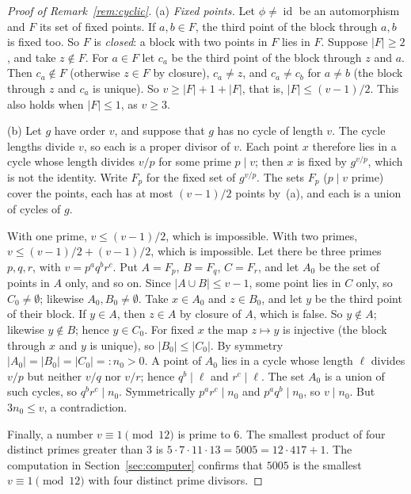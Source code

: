 \documentclass[11pt]{amsart}
\theoremstyle{plain}
\theoremstyle{definition}
\theoremstyle{remark}
\numberwithin{equation}{section}
\newcommand{\abs}[1]{\lvert #1\rvert}
\DeclareMathOperator{\id}{id}
\begin{document}
\begin{proof}[Proof of Remark~\ref{rem:cyclic}]
(a) \emph{Fixed points.} Let \(\phi\ne\id\) be an automorphism and \(F\) its set of fixed points. If \(a,b\in F\), the third point of the block through \(a,b\) is fixed too. So \(F\) is \emph{closed}: a block with two points in \(F\) lies in \(F\). Suppose \(\abs{F}\ge2\), and take \(z\notin F\). For \(a\in F\) let \(c_a\) be the third point of the block through \(z\) and \(a\). Then \(c_a\notin F\) (otherwise \(z\in F\) by closure), \(c_a\ne z\), and \(c_a\ne c_b\) for \(a\ne b\) (the block through \(z\) and \(c_a\) is unique). So \(v\ge\abs{F}+1+\abs{F}\), that is, \(\abs{F}\le(v-1)/2\). This also holds when \(\abs{F}\le1\), as \(v\ge3\).

(b) Let \(g\) have order \(v\), and suppose that \(g\) has no cycle of length \(v\). The cycle lengths divide \(v\), so each is a proper divisor of \(v\). Each point \(x\) therefore lies in a cycle whose length divides \(v/p\) for some prime \(p\mid v\); then \(x\) is fixed by \(g^{v/p}\), which is not the identity. Write \(F_p\) for the fixed set of \(g^{v/p}\). The sets \(F_p\) (\(p\mid v\) prime) cover the points, each has at most \((v-1)/2\) points by~(a), and each is a union of cycles of \(g\).

With one prime, \(v\le(v-1)/2\), which is impossible. With two primes, \(v\le(v-1)/2+(v-1)/2\), which is impossible. Let there be three primes \(p,q,r\), with \(v=p^aq^br^c\). Put \(A=F_p\), \(B=F_q\), \(C=F_r\), and let \(A_0\) be the set of points in \(A\) only, and so on. Since \(\abs{A\cup B}\le v-1\), some point lies in \(C\) only, so \(C_0\ne\emptyset\); likewise \(A_0,B_0\ne\emptyset\). Take \(x\in A_0\) and \(z\in B_0\), and let \(y\) be the third point of their block. If \(y\in A\), then \(z\in A\) by closure of \(A\), which is false. So \(y\notin A\); likewise \(y\notin B\); hence \(y\in C_0\). For fixed \(x\) the map \(z\mapsto y\) is injective (the block through \(x\) and \(y\) is unique), so \(\abs{B_0}\le\abs{C_0}\). By symmetry \(\abs{A_0}=\abs{B_0}=\abs{C_0}=:n_0>0\). A point of \(A_0\) lies in a cycle whose length \(\ell\) divides \(v/p\) but neither \(v/q\) nor \(v/r\); hence \(q^b\mid\ell\) and \(r^c\mid\ell\). The set \(A_0\) is a union of such cycles, so \(q^br^c\mid n_0\). Symmetrically \(p^ar^c\mid n_0\) and \(p^aq^b\mid n_0\), so \(v\mid n_0\). But \(3n_0\le v\), a contradiction.

Finally, a number \(v\equiv1\pmod{12}\) is prime to \(6\). The smallest product of four distinct primes greater than \(3\) is \(5\cdot7\cdot11\cdot13=5005=12\cdot417+1\). The computation in Section~\ref{sec:computer} confirms that \(5005\) is the smallest \(v\equiv1\pmod{12}\) with four distinct prime divisors.
\end{proof}
\end{document}
